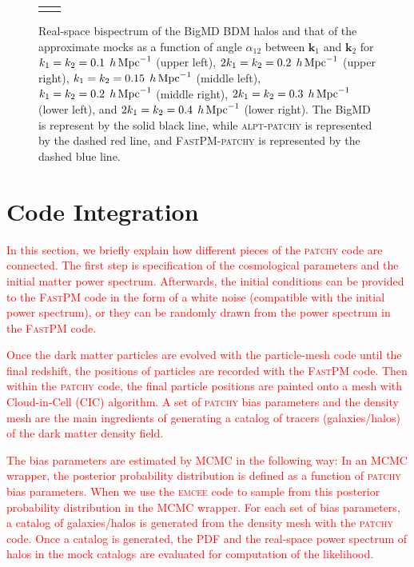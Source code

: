 \documentclass[english,usenatbib]{mn2e}
\newcommand{\tod}[1]{{\textcolor{red}{ #1}}}
\newcommand{\hperm}{\,h\,{\rm Mpc}^{-1}}
\begin{document}
\begin{figure}
\begin{tabular}{cc}
\vspace{-0.25cm}
\end{tabular}
\caption{\label{fig:bispec} Real-space bispectrum of the BigMD BDM halos and that of the approximate mocks as a function of angle $\alpha_{12}$ between $\mathbf{k}_1$ and $\mathbf{k}_{2}$ for $k_{1}=k_{2}=0.1\; \hperm$ (upper left), $2k_{1}=k_{2}=0.2\; \hperm$ (upper right), $k_{1}=k_{2}=0.15\; \hperm$ (middle left), $k_{1}=k_{2}=0.2\; \hperm$ (middle right), $2k_{1}=k_{2}=0.3\; \hperm$ (lower left), and $2k_{1}=k_{2}=0.4\; \hperm$ (lower right). The BigMD is represent by the solid black line, while \textsc{alpt}-\textsc{patchy} is represented by the dashed red line, and \textsc{FastPM}-\textsc{patchy} is represented by the dashed blue line.}
\end{figure}

\section{Code Integration}
\tod{In this section, we briefly explain how different pieces of the \textsc{patchy} code are connected. The first step is specification of the cosmological parameters and the initial matter power spectrum. Afterwards, the initial conditions can be provided to the \textsc{FastPM} code in the form of a white noise (compatible with the initial power spectrum), or they can be randomly drawn from the power spectrum in the \textsc{FastPM} code.}

\tod{Once the dark matter particles are evolved with the
particle-mesh code until the final redshift, the positions
of particles are recorded with the \textsc{FastPM} code. Then
within the \textsc{patchy} code, the final particle positions are
painted onto a mesh with Cloud-in-Cell (CIC) algorithm.
A set of \textsc{patchy} bias parameters and the density mesh
are the main ingredients of generating a catalog of tracers
(galaxies/halos) of the dark matter density field.}

\tod{The bias parameters are estimated by MCMC in the following way: 
In an MCMC wrapper, the posterior probability distribution is defined as a function of \textsc{patchy} bias parameters. When we use the \textsc{emcee} code to sample from this posterior probability distribution in the MCMC wrapper. For each set of bias parameters, a catalog of galaxies/halos is generated from the density mesh with the \textsc{patchy} code. Once a catalog is generated, the PDF and the real-space power spectrum of halos in the mock catalogs are evaluated for computation of the likelihood.}
\end{document}
